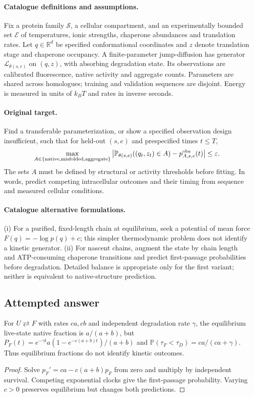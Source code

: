 \documentclass[11pt]{article}
\begin{document}
\paragraph{Catalogue definitions and assumptions.}
Fix a protein family $\mathcal S$, a cellular compartment, and an experimentally bounded set $\mathcal E$ of temperatures, ionic strengths, chaperone abundances and translation rates. Let $q\in\mathbb{R}^d$ be specified conformational coordinates and $z$ denote translation stage and chaperone occupancy. A finite-parameter jump-diffusion has generator $\mathcal L_{\theta(s,e)}$ on $(q,z)$, with absorbing degradation state. Its observations are calibrated fluorescence, native activity and aggregate counts. Parameters are shared across homologues; training and validation sequences are disjoint. Energy is measured in units of $k_BT$ and rates in inverse seconds.
\paragraph{Original target.}
Find a transferable parameterization, or show a specified observation design insufficient, such that for held-out $(s,e)$ and prespecified times $t\leq T$,
\[
\max_{A\in\{\mathrm{native},\mathrm{misfolded},\mathrm{aggregate}\}}
\left|\mathbb{P}_{\theta(s,e)}((q_t,z_t)\in A)-p^{\rm obs}_{A,s,e}(t)\right|\leq\varepsilon.
\]
The sets $A$ must be defined by structural or activity thresholds before fitting. In words, predict competing intracellular outcomes and their timing from sequence and measured cellular conditions.
\paragraph{Catalogue alternative formulations.}
(i) For a purified, fixed-length chain at equilibrium, seek a potential of mean force $F(q)=-\log p(q)+c$; this simpler thermodynamic problem does not identify a kinetic generator. (ii) For nascent chains, augment the state by chain length and ATP-consuming chaperone transitions and predict first-passage probabilities before degradation. Detailed balance is appropriate only for the first variant; neither is equivalent to native-structure prediction.
\subsection{Attempted answer}
\begin{proposition}
For $U\rightleftarrows F$ with rates $ca,cb$ and independent degradation rate $\gamma$, the equilibrium live-state native fraction is $a/(a+b)$, but $P_F(t)=e^{-\gamma t}a(1-e^{-c(a+b)t})/(a+b)$ and $\mathbb{P}(\tau_F<\tau_D)=ca/(ca+\gamma)$. Thus equilibrium fractions do not identify kinetic outcomes.
\end{proposition}
\begin{proof}
Solve $p_F\prime=ca-c(a+b)p_F$ from zero and multiply by independent survival. Competing exponential clocks give the first-passage probability. Varying $c>0$ preserves equilibrium but changes both predictions.
\end{proof}
\end{document}
